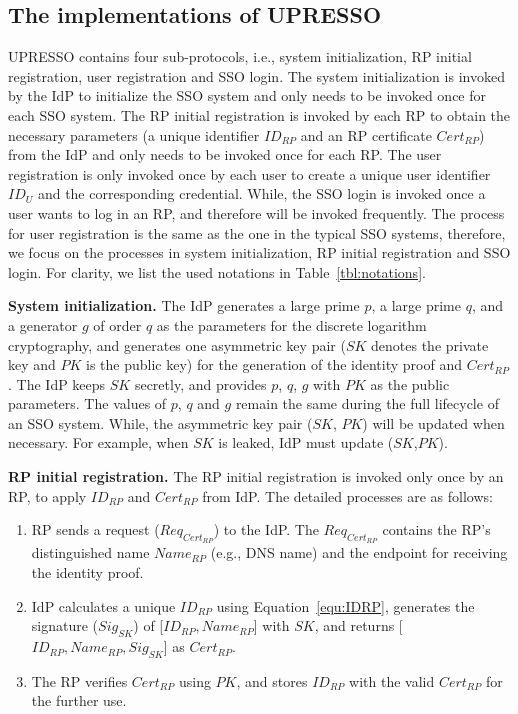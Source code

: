 \subsection{The implementations of UPRESSO}
\label{implementations}
UPRESSO contains four sub-protocols, i.e., system initialization, RP initial registration, user registration and SSO login.
The system initialization is invoked by the IdP to initialize the SSO system and only needs to be invoked once for each SSO system.
The RP initial registration is invoked by each RP to obtain the necessary parameters (a unique identifier $ID_{RP}$ and an RP certificate $Cert_{RP}$) from the IdP and only needs to be invoked once for each RP.
The user registration is only invoked once by each user to create a unique user identifier $ID_U$ and the corresponding credential.
While, the SSO login is invoked once a user wants to log in an RP, and therefore will be invoked frequently.
The process for user registration is the same as the one in the typical SSO systems,
therefore, we focus on the processes in  system initialization, RP initial registration and SSO login.
For clarity, we list the used notations  in Table~\ref{tbl:notations}.

\vspace{1mm}\noindent \textbf{System initialization.} The IdP generates a large prime $p$, a large prime $q$, and a generator $g$ of order $q$ as  the parameters for the discrete logarithm cryptography, and generates one asymmetric key pair ($SK$ denotes the private key and $PK$ is the public key) for the generation of the identity proof and $Cert_{RP}$.
The IdP keeps $SK$ secretly, and provides $p$, $q$, $g$ with $PK$ as the public parameters.
The values of $p$, $q$ and $g$ remain the same during the full lifecycle of an SSO system.
While, the asymmetric key pair ($SK$, $PK$) will be updated when necessary. For example, when $SK$ is leaked, IdP must update ($SK$,$PK$).

\vspace{1mm}\noindent\textbf{RP initial registration.}
The RP initial registration is invoked only once by an RP, to apply $ID_{RP}$ and $Cert_{RP}$ from IdP.
The detailed processes are as follows:
\begin{enumerate}
\item RP sends a request ($Req_{Cert_{RP}}$) to the IdP. The $Req_{Cert_{RP}}$ contains the RP's distinguished name $Name_{RP}$ (e.g., DNS name) and the endpoint for receiving the identity proof.
\item IdP calculates a unique $ID_{RP}$ using Equation~\ref{equ:IDRP},  generates the signature ($Sig_{SK}$) of [$ID_{RP}, Name_{RP}$] with $SK$, and returns [$ID_{RP}, Name_{RP}, Sig_{SK}$] as $Cert_{RP}$.
\item The RP  verifies $Cert_{RP}$ using $PK$,  and stores $ID_{RP}$ with the valid $Cert_{RP}$ for the further use.
\end{enumerate}


